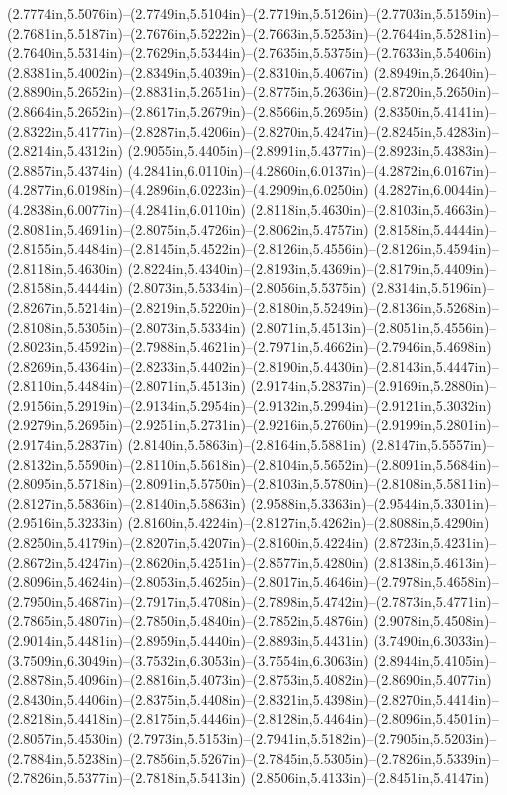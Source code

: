 (2.7774in,5.5076in)--(2.7749in,5.5104in)--(2.7719in,5.5126in)--(2.7703in,5.5159in)--(2.7681in,5.5187in)--(2.7676in,5.5222in)--(2.7663in,5.5253in)--(2.7644in,5.5281in)--(2.7640in,5.5314in)--(2.7629in,5.5344in)--(2.7635in,5.5375in)--(2.7633in,5.5406in) (2.8381in,5.4002in)--(2.8349in,5.4039in)--(2.8310in,5.4067in) (2.8949in,5.2640in)--(2.8890in,5.2652in)--(2.8831in,5.2651in)--(2.8775in,5.2636in)--(2.8720in,5.2650in)--(2.8664in,5.2652in)--(2.8617in,5.2679in)--(2.8566in,5.2695in) (2.8350in,5.4141in)--(2.8322in,5.4177in)--(2.8287in,5.4206in)--(2.8270in,5.4247in)--(2.8245in,5.4283in)--(2.8214in,5.4312in) (2.9055in,5.4405in)--(2.8991in,5.4377in)--(2.8923in,5.4383in)--(2.8857in,5.4374in) (4.2841in,6.0110in)--(4.2860in,6.0137in)--(4.2872in,6.0167in)--(4.2877in,6.0198in)--(4.2896in,6.0223in)--(4.2909in,6.0250in) (4.2827in,6.0044in)--(4.2838in,6.0077in)--(4.2841in,6.0110in) (2.8118in,5.4630in)--(2.8103in,5.4663in)--(2.8081in,5.4691in)--(2.8075in,5.4726in)--(2.8062in,5.4757in) (2.8158in,5.4444in)--(2.8155in,5.4484in)--(2.8145in,5.4522in)--(2.8126in,5.4556in)--(2.8126in,5.4594in)--(2.8118in,5.4630in) (2.8224in,5.4340in)--(2.8193in,5.4369in)--(2.8179in,5.4409in)--(2.8158in,5.4444in) (2.8073in,5.5334in)--(2.8056in,5.5375in) (2.8314in,5.5196in)--(2.8267in,5.5214in)--(2.8219in,5.5220in)--(2.8180in,5.5249in)--(2.8136in,5.5268in)--(2.8108in,5.5305in)--(2.8073in,5.5334in) (2.8071in,5.4513in)--(2.8051in,5.4556in)--(2.8023in,5.4592in)--(2.7988in,5.4621in)--(2.7971in,5.4662in)--(2.7946in,5.4698in) (2.8269in,5.4364in)--(2.8233in,5.4402in)--(2.8190in,5.4430in)--(2.8143in,5.4447in)--(2.8110in,5.4484in)--(2.8071in,5.4513in) (2.9174in,5.2837in)--(2.9169in,5.2880in)--(2.9156in,5.2919in)--(2.9134in,5.2954in)--(2.9132in,5.2994in)--(2.9121in,5.3032in) (2.9279in,5.2695in)--(2.9251in,5.2731in)--(2.9216in,5.2760in)--(2.9199in,5.2801in)--(2.9174in,5.2837in) (2.8140in,5.5863in)--(2.8164in,5.5881in) (2.8147in,5.5557in)--(2.8132in,5.5590in)--(2.8110in,5.5618in)--(2.8104in,5.5652in)--(2.8091in,5.5684in)--(2.8095in,5.5718in)--(2.8091in,5.5750in)--(2.8103in,5.5780in)--(2.8108in,5.5811in)--(2.8127in,5.5836in)--(2.8140in,5.5863in) (2.9588in,5.3363in)--(2.9544in,5.3301in)--(2.9516in,5.3233in) (2.8160in,5.4224in)--(2.8127in,5.4262in)--(2.8088in,5.4290in) (2.8250in,5.4179in)--(2.8207in,5.4207in)--(2.8160in,5.4224in) (2.8723in,5.4231in)--(2.8672in,5.4247in)--(2.8620in,5.4251in)--(2.8577in,5.4280in) (2.8138in,5.4613in)--(2.8096in,5.4624in)--(2.8053in,5.4625in)--(2.8017in,5.4646in)--(2.7978in,5.4658in)--(2.7950in,5.4687in)--(2.7917in,5.4708in)--(2.7898in,5.4742in)--(2.7873in,5.4771in)--(2.7865in,5.4807in)--(2.7850in,5.4840in)--(2.7852in,5.4876in) (2.9078in,5.4508in)--(2.9014in,5.4481in)--(2.8959in,5.4440in)--(2.8893in,5.4431in) (3.7490in,6.3033in)--(3.7509in,6.3049in)--(3.7532in,6.3053in)--(3.7554in,6.3063in) (2.8944in,5.4105in)--(2.8878in,5.4096in)--(2.8816in,5.4073in)--(2.8753in,5.4082in)--(2.8690in,5.4077in) (2.8430in,5.4406in)--(2.8375in,5.4408in)--(2.8321in,5.4398in)--(2.8270in,5.4414in)--(2.8218in,5.4418in)--(2.8175in,5.4446in)--(2.8128in,5.4464in)--(2.8096in,5.4501in)--(2.8057in,5.4530in) (2.7973in,5.5153in)--(2.7941in,5.5182in)--(2.7905in,5.5203in)--(2.7884in,5.5238in)--(2.7856in,5.5267in)--(2.7845in,5.5305in)--(2.7826in,5.5339in)--(2.7826in,5.5377in)--(2.7818in,5.5413in) (2.8506in,5.4133in)--(2.8451in,5.4147in) 